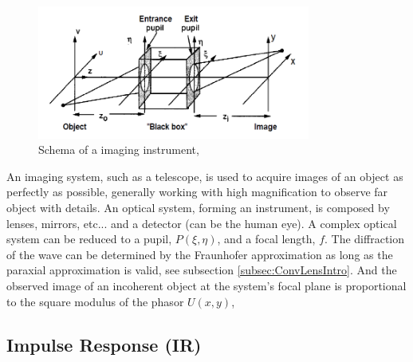\begin{figure}
\begin{center}
\includegraphics[width=0.8\textwidth,angle=0]{Figures/ImagingInstrumentGenSchema}
\decoRule
\caption{Schema of a imaging instrument, \citep[Chapter 6.1]{goodman_1968}}
\label{fig:ImagingInstrumentGenSchema}
\end{center}
\end{figure}

An imaging system, such as a telescope, is used to acquire images of an object as perfectly as possible, generally working with high magnification to observe far object with details. An optical system, forming an instrument, is composed by lenses, mirrors, etc... and a detector (can be the human eye). A complex optical system can be reduced to a pupil, $P(\xi,\eta)$, and a focal length, $f$. The diffraction of the wave can be determined by the Fraunhofer approximation as long as the paraxial approximation is valid, see subsection \ref{subsec:ConvLensIntro}. And the observed image of an incoherent object at the system's focal plane is proportional to the square modulus of the phasor $U(x,y)$,


\subsection{Impulse Response (IR)}
\label{subsec:IR} 

